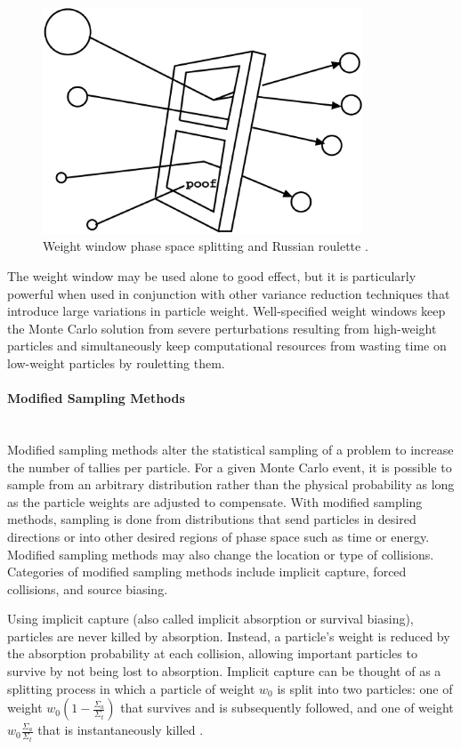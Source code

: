 \begin{figure}[!htb]
\centering
\includegraphics[width=0.85\textwidth]{img/ww-mcnp.eps}
\caption{Weight window phase space splitting and Russian roulette \cite{mcnp}.}
\label{fig:ww}
\end{figure}

The weight window may be used alone to good effect, but it is particularly powerful
when used in conjunction with other variance reduction techniques that introduce large
variations in particle weight. Well-specified weight windows keep the Monte Carlo 
solution from severe perturbations resulting from high-weight particles and 
simultaneously keep computational resources from wasting time on low-weight particles
by rouletting them.

\paragraph{Modified Sampling Methods}\mbox{} \\

Modified sampling methods alter the statistical sampling of a problem to increase the 
number of tallies per particle. For a given Monte Carlo event, it is possible to 
sample from an arbitrary distribution rather than the physical probability as long as 
the particle weights are adjusted to compensate. With modified sampling methods, 
sampling is done from distributions that send particles in desired directions or into 
other desired regions of phase space such as time or energy. Modified sampling methods
may also change the location or type of collisions. Categories of modified sampling
methods include implicit capture, forced collisions, and source biasing.

Using implicit capture (also called implicit absorption or survival biasing), 
particles are never killed by absorption. Instead, a particle's weight is reduced by
the absorption probability at each collision, allowing important particles to
survive by not being lost to absorption. Implicit capture can be thought of as a 
splitting process in which a particle of weight $w_0$ is split into two particles: one
of weight $w_0(1-\frac{\Sigma_a}{\Sigma_t})$ that survives and is 
subsequently followed, and one of weight $w_0\frac{\Sigma_a}{\Sigma_t}$ that is
instantaneously killed \cite{mcnp}.

